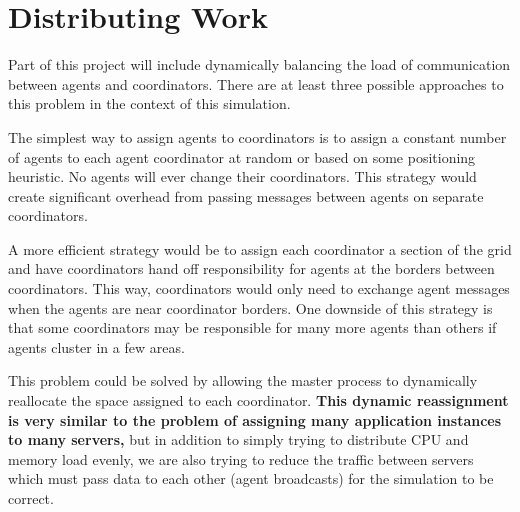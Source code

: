 \section{Distributing Work}

Part of this project will include dynamically balancing the load of communication between agents and coordinators. There are at least three possible approaches to this problem in the context of this simulation.

The simplest way to assign agents to coordinators is to assign a constant number of agents to each agent coordinator at random or based on some positioning heuristic. No agents will ever change their coordinators. This strategy would create significant overhead from passing messages between agents on separate coordinators.

A more efficient strategy would be to assign each coordinator a section of the grid and have coordinators hand off responsibility for agents at the borders between coordinators. This way, coordinators would only need to exchange agent messages when the agents are near coordinator borders. One downside of this strategy is that some coordinators may be responsible for many more agents than others if agents cluster in a few areas.

This problem could be solved by allowing the master process to dynamically reallocate the space assigned to each coordinator. \textbf{This dynamic reassignment is very similar to the problem of assigning many application instances to many servers,} but in addition to simply trying to distribute CPU and memory load evenly, we are also trying to reduce the traffic between servers which must pass data to each other (agent broadcasts) for the simulation to be correct.
